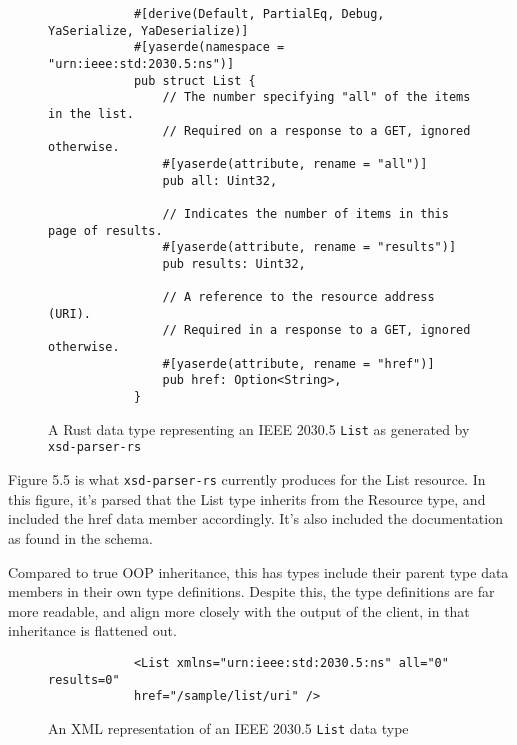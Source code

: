 \begin{figure}[H]
    \begin{center}
        \begin{lstlisting}
            #[derive(Default, PartialEq, Debug, YaSerialize, YaDeserialize)]
            #[yaserde(namespace = "urn:ieee:std:2030.5:ns")]
            pub struct List {
                // The number specifying "all" of the items in the list. 
                // Required on a response to a GET, ignored otherwise.
                #[yaserde(attribute, rename = "all")]
                pub all: Uint32,
            
                // Indicates the number of items in this page of results.
                #[yaserde(attribute, rename = "results")]
                pub results: Uint32,
            
                // A reference to the resource address (URI). 
                // Required in a response to a GET, ignored otherwise.
                #[yaserde(attribute, rename = "href")]
                pub href: Option<String>,
            }
        \end{lstlisting}
        \label{fig:listauto}
        \caption{A Rust data type representing an IEEE 2030.5 \texttt{List} as generated by \texttt{xsd-parser-rs}}
    \end{center}
\end{figure}

Figure 5.5 is what \texttt{xsd-parser-rs} currently produces for the List resource. In this figure, it's parsed that the List type inherits from the Resource type, and included the href data member accordingly. It's also included the documentation as found in the schema.

Compared to true OOP inheritance, this has types include their parent type data members in their own type definitions.
Despite this, the type definitions are far more readable, and align more closely with the output of the client, in that inheritance is flattened out.


\begin{figure}[H]
    \begin{center}
        \begin{lstlisting}
            <List xmlns="urn:ieee:std:2030.5:ns" all="0" results=0" 
            href="/sample/list/uri" />
        \end{lstlisting}
        \label{fig:listxml}
        \caption{An XML representation of an IEEE 2030.5 \texttt{List} data type}
    \end{center}
\end{figure}

